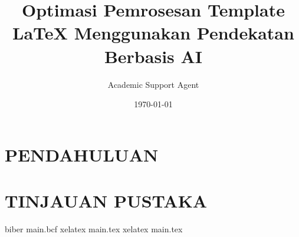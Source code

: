 \documentclass{article}
\title{Optimasi Pemrosesan Template LaTeX Menggunakan Pendekatan Berbasis AI}
\author{Academic Support Agent}
\date{\today}
\begin{document}
\maketitle

\begin{abstract}

\end{abstract}

\chapter{PENDAHULUAN}


\chapter{TINJAUAN PUSTAKA}


biber main.bcf
xelatex main.tex
xelatex main.tex
\end{document}
